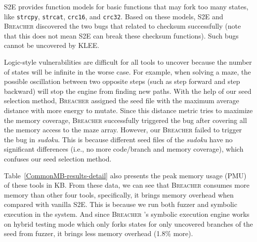 \documentclass{cta-author}
\newcommand{\prototype}{\textsc{Breacher} }
\begin{document}
S2E provides function models for basic functions that may fork too 
many states, like \texttt{strcpy}, \texttt{strcat}, \texttt{crc16},
and \texttt{crc32}. Based on these models, S2E and \prototype 
discovered the two bugs that related to checksum successfully 
(note that this does not mean S2E can break these checksum functions). 
Such bugs cannot be uncovered by KLEE. 

Logic-style vulnerabilities are difficult for all tools to uncover 
because the number of states will be infinite in the worse case.
For example, when solving a maze, the possible oscillation between 
two opposite steps (such as step forward and step backward) 
will stop the engine from finding new paths.
With the help of our seed selection method, \prototype assigned 
the seed file with the maximum average distance with more energy to mutate. 
Since this distance metric tries to maximize the memory coverage, 
\prototype successfully triggered the bug after covering all 
the memory access to the maze array. 
However, our \prototype failed to trigger the bug in \textit{sudoku}. 
This is because different seed files of the \textit{sudoku} have no 
significant differences (i.e., no more code/branch and memory coverage), 
which confuses our seed selection method.

Table~\ref{CommonMB-results-detail} also presents the peak memory usage (PMU)
of these tools in KB. From these data, we can see that \prototype consumes
more memory than other four tools, specifically, it brings memory
overhead when compared with vanilla S2E. This is because we run both fuzzer and
symbolic execution in the system. And since \prototype's symbolic execution engine
works on hybrid testing mode which only forks states for only uncovered branches of 
the seed from fuzzer, it brings less memory overhead (1.8\% more).
\end{document}
